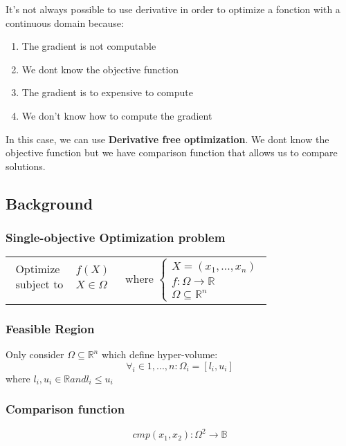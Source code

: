 
It's not always possible to use derivative in order to optimize a
fonction with a continuous domain because:
\begin{enumerate}
    \item  The gradient is not computable
    \item  We dont know the objective function
    \item  The gradient is to expensive to compute
    \item  We don't know how to compute the gradient
\end{enumerate}

In this case, we can use \textbf{Derivative free optimization}.
We dont know the objective function but we have comparison function that allows us to compare solutions.


\subsection{Background}

\subsubsection{Single-objective Optimization problem}
\begin{tabular}{m{6cm}m{6cm}}
    \begin{eqnarray*}
        \textrm{Optimize } & f(X)\\
        \textrm{subject to } & X \in \Omega\\
    \end{eqnarray*}
    &
    where $ \begin{cases}
        X = (x_1, ..., x_n)\\
        f: \Omega \rightarrow \mathbb{R}\\
        \Omega \subseteq \mathbb{R}^n
    \end{cases}$
\end{tabular}

\subsubsection{Feasible Region}

Only consider $\Omega \subseteq \mathbb{R}^n$ which define hyper-volume:
$$\forall_i \in 1,..., n: \Omega_i = [l_i, u_i]$$ 
where $l_i, u_i \in \mathbb{R} and l_i \leq u_i$

\subsubsection{Comparison function}
$$cmp(x_1, x_2) : \Omega^2 \rightarrow \mathbb{B}$$

